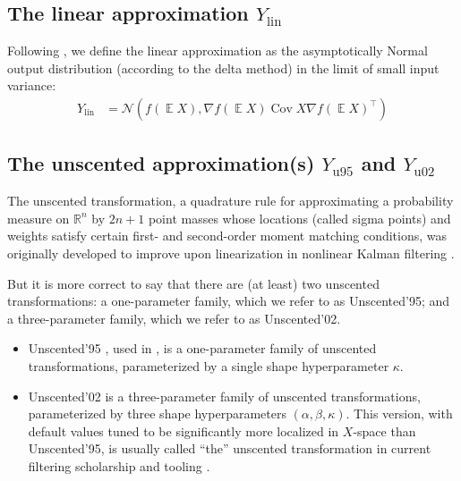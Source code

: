 \documentclass{article}
\DeclareMathOperator{\expect}{\mathbb{E}}
\DeclareMathOperator{\Cov}{\operatorname{Cov}}
\begin{document}
\subsection{The linear approximation \(Y_\mathrm{lin}\)}
Following \citet{titensky_uncertainty_2018, nagel_kalman-bucy-informed_2022,petersen_uncertainty_2024, jungmann_analytical_2025}, we define the linear approximation as the asymptotically Normal output distribution (according to the delta method) in the limit of small input variance:
\begin{align*}
  Y_\mathrm{lin} &= \mathcal N(f(\expect X), \nabla f(\expect X) \Cov X \nabla f(\expect X)^\intercal)
\end{align*}

\subsection{The unscented approximation(s) \(Y_\mathrm{u95}\) and \(Y_\mathrm{u02}\)}
The unscented transformation, a quadrature rule for approximating a probability measure on \(\mathbb{R}^n\) by \(2n + 1\) point masses whose locations (called sigma points) and weights satisfy certain first- and second-order moment matching conditions, was originally developed to improve upon linearization in nonlinear Kalman filtering \citep{julier_new_1995,julier_new_1997,julier_new_2000,julier_scaled_2002,wan_unscented_2000,julier_unscented_2004}.

But it is more correct to say that there are (at least) two unscented transformations: a one-parameter family, which we refer to as Unscented'95; and a three-parameter family, which we refer to as Unscented'02.
\begin{itemize}
  \item Unscented'95 \citep{julier_new_1995,julier_new_1997,julier_new_2000}, used in \citet{astudillo_propagation_2011,abdelaziz_uncertainty_2015}, is a one-parameter family of unscented transformations, parameterized by a single shape hyperparameter \(\kappa\).
  \item Unscented'02 \citep{julier_scaled_2002,wan_unscented_2000} is a three-parameter family of unscented transformations, parameterized by three shape hyperparameters \((\alpha, \beta, \kappa)\).
  This version, with default values tuned to be significantly more localized in \(X\)-space than Unscented'95, is usually called ``the'' unscented transformation in current filtering scholarship \cite{jiang_new_2025} and tooling \cite{ljung_unscentedkalmanfilter_2025}.
\end{itemize}
\end{document}
